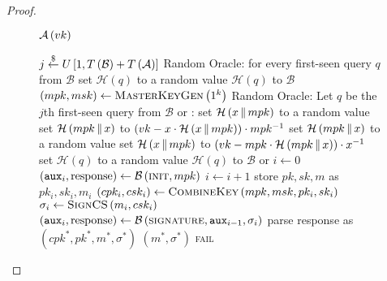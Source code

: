 \begin{proof}
    \begin{figure}[!htbp]
      \begin{algobox}{$\mathcal{A}\left(vk\right)$}
        \begin{algorithmic}[1]
          \State $j \overset{\$}{\gets} U\left[1, T\left(\mathcal{B}\right) +
          T\left(\mathcal{A}\right)\right]$
          \Indent
            \State Random Oracle: for every first-seen query $q$ from
            $\mathcal{B}$ set $\mathcal{H}\left(q\right)$ to a random value
            \State \Return $\mathcal{H}\left(q\right)$ to $\mathcal{B}$
          \EndIndent
          \State $\left(mpk, msk\right) \gets
          \textsc{MasterKeyGen}\left(1^k\right)$
          \Indent
            \State Random Oracle: Let $q$ be the $j$th first-seen query from
            $\mathcal{B}$ or \adversary:
                \State set $\mathcal{H}\left(x \,\|\, mpk\right)$ to a random
                value
              \EndIf
              \State set $\mathcal{H}\left(mpk \,\|\, x\right)$ to $\left(vk
              - x \cdot \mathcal{H}\left(x \,\|\, mpk\right)\right) \cdot
              mpk^{-1}$
                \State set $\mathcal{H}\left(mpk \,\|\, x\right)$ to a random
                value
              \EndIf
              \State set $\mathcal{H}\left(x \,\|\, mpk\right)$ to $\left(vk
              - mpk \cdot \mathcal{H}\left(mpk \,\|\, x\right)\right) \cdot
              x^{-1}$
            \Else
              \State set $\mathcal{H}\left(q\right)$ to a random value
            \EndIf
            \State \Return $\mathcal{H}\left(q\right)$ to $\mathcal{B}$ or
            \adversary
          \EndIndent
          \State $i \gets 0$
          \State $\left(\mathtt{aux}_i, \mathrm{response}\right) \gets
          \mathcal{B}\left(\textsc{init}, mpk\right)$
            \State $i \gets i + 1$
            \State store $pk, sk, m$ as $pk_i, sk_i, m_i$
            \State $\left(cpk_i, csk_i\right) \gets
            \textsc{CombineKey}\left(mpk, msk, pk_i, sk_i\right)$
            \State $\sigma_i \gets \textsc{SignCS}\left(m_i, csk_i\right)$
            \State $\left(\mathtt{aux}_i, \mathrm{response}\right) \gets
            \mathcal{B}\left(\textsc{signature}, \mathtt{aux}_{i-1},
            \sigma_i\right)$
          \EndWhile
          \State parse response as $\left(cpk^*, pk^*, m^*, \sigma^*\right)$
           
          \label{proof:comb:master:distinguisher:won}
            \State \Return $\left(m^*, \sigma^*\right)$
          \Else
            \State \Return \textsc{fail}
          \EndIf
        \end{algorithmic}
      \end{algobox}
      \caption{}
      \label{proof:comb:master:distinguisher}
    \end{figure}


\end{proof}
